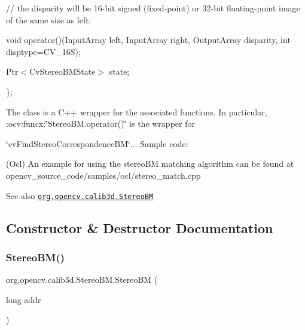 {\ttfamily }

{\ttfamily }

{\ttfamily // the disparity will be 16-\/bit signed (fixed-\/point) or 32-\/bit floating-\/point image of the same size as left.}

{\ttfamily }

{\ttfamily }

{\ttfamily void operator()(Input\+Array left, Input\+Array right, Output\+Array disparity, int disptype=C\+V\+\_\+16S);}

{\ttfamily }

{\ttfamily }

{\ttfamily Ptr$<$\+Cv\+Stereo\+B\+M\+State$>$ state;}

{\ttfamily }

{\ttfamily }

{\ttfamily \};}

{\ttfamily }

{\ttfamily }

{\ttfamily The class is a C++ wrapper for the associated functions. In particular, \+:ocv\+:funcx\+:\char`\"{}\+Stereo\+B\+M.\+operator()\char`\"{} is the wrapper for }

\char`\"{}cv\+Find\+Stereo\+Correspondence\+B\+M\char`\"{}... Sample code\+:

(Ocl) An example for using the stereo\+BM matching algorithm can be found at opencv\+\_\+source\+\_\+code/samples/ocl/stereo\+\_\+match.\+cpp

\begin{DoxySeeAlso}{See also}
\href{http://docs.opencv.org/modules/calib3d/doc/camera_calibration_and_3d_reconstruction.html#stereobm}{\tt org.\+opencv.\+calib3d.\+Stereo\+BM} 
\end{DoxySeeAlso}


\subsection{Constructor \& Destructor Documentation}
\mbox{\label{classorg_1_1opencv_1_1calib3d_1_1_stereo_b_m_a50bd97cac119f57c04226fee83eec15d}} 
\subsubsection{\texorpdfstring{Stereo\+B\+M()}{StereoBM()}\hspace{0.1cm}{\footnotesize\ttfamily [1/4]}}
{\footnotesize\ttfamily org.\+opencv.\+calib3d.\+Stereo\+B\+M.\+Stereo\+BM (\begin{DoxyParamCaption}\item[{long}]{addr }\end{DoxyParamCaption})\hspace{0.3cm}{\ttfamily [protected]}}

